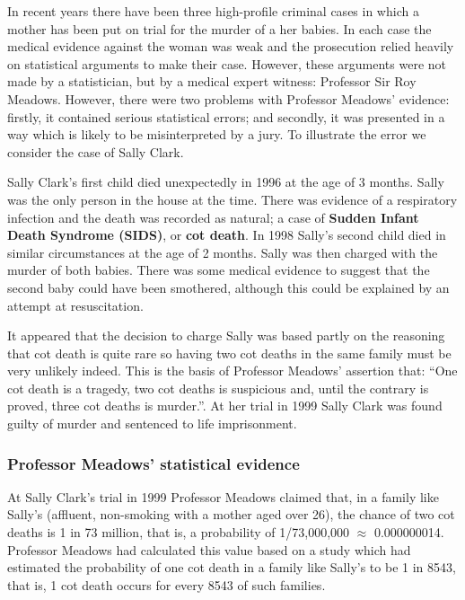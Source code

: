 \documentclass[
  11pt,
  british,
  openany, a4paper]{book}
\begin{document}
In recent years there have been three high-profile criminal cases in which a mother has been put on trial for the murder of a her babies. In each case the medical evidence against the woman was weak and the prosecution relied heavily on statistical arguments to make their case. However, these arguments were not made by a statistician, but by a medical expert witness: Professor Sir Roy Meadows. However, there were two problems with Professor Meadows' evidence: firstly, it contained serious statistical errors; and secondly, it was presented in a way which is likely to be misinterpreted by a jury. To illustrate the error we consider the case of Sally Clark.

Sally Clark's first child died unexpectedly in 1996 at the age of 3 months. Sally was the only person in the house at the time. There was evidence of a respiratory infection and the death was recorded as natural; a case of \textbf{Sudden Infant Death Syndrome (SIDS)}, or \textbf{cot death}. In 1998 Sally's second child died in similar circumstances at the age of 2 months. Sally was then charged with the murder of both babies. There was some medical evidence to suggest that the second baby could have been smothered, although this could be explained by an attempt at resuscitation.

It appeared that the decision to charge Sally was based partly on the reasoning that cot death is quite rare so having two cot deaths in the same family must be very unlikely indeed. This is the basis of Professor Meadows' assertion that: ``One cot death is a tragedy, two cot deaths is suspicious and, until the contrary is proved, three cot deaths is murder.''. At her trial in 1999 Sally Clark was found guilty of murder and sentenced to life imprisonment.

\hypertarget{professor-meadows-statistical-evidence}{%
\subsubsection*{Professor Meadows' statistical evidence}\label{professor-meadows-statistical-evidence}}

At Sally Clark's trial in 1999 Professor Meadows claimed that, in a family like Sally's (affluent, non-smoking with a mother aged over 26), the chance of two cot deaths is 1 in 73 million, that is, a probability of 1/73,000,000 \(\approx\) 0.000000014. Professor Meadows had calculated this value based on a study which had estimated the probability of one cot death in a family like Sally's to be 1 in 8543, that is, 1 cot death occurs for every 8543 of such families.
\end{document}
